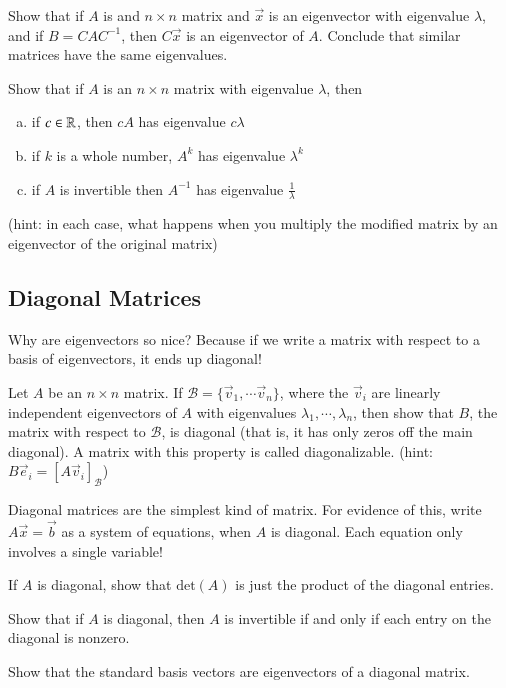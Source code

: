 \documentclass[Main.tex]{subfiles}
\begin{document}
\begin{Ex}
  Show that if $A$ is and $n\times n$ matrix and $\vec{x}$ is an eigenvector with eigenvalue $\lambda$, and if $B=CAC^{-1}$, then $C\vec{x}$ is an eigenvector of $A$.
  Conclude that similar matrices have the same eigenvalues.
\end{Ex}
\begin{Ex}
  Show that if $A$ is an $n\times n$ matrix with eigenvalue $\lambda$, then
  \begin{enumerate}[a)]
    \indentitem \item if $c\in \mathbb{R}$, then $cA$ has eigenvalue $c\lambda$
  \item if $k$ is a whole number, $A^k$ has eigenvalue $\lambda^k$
  \item if $A$ is invertible then $A^{-1}$ has eigenvalue $\frac{1}{\lambda}$
  \end{enumerate}
  (hint: in each case, what happens when you multiply the modified matrix by an eigenvector of the original matrix)
\end{Ex}


\subsection{Diagonal Matrices}

Why are eigenvectors so nice?
Because if we write a matrix with respect to a basis of eigenvectors, it ends up diagonal!
\begin{ImpEasyEx}
  Let $A$ be an $n\times n$ matrix.  
  If $\mathcal{B}=\{\vec{v}_1,\cdots\vec{v}_n\}$, where the $\vec{v}_i$ are linearly independent eigenvectors of $A$ with eigenvalues $\lambda_1,\cdots,\lambda_n$, then 
  show that $B$, the matrix with respect to $\mathcal{B}$, is diagonal (that is, it has only zeros off the main diagonal).  
  A matrix with this property is called diagonalizable.
  (hint: $B\vec{e}_i= [A\vec{v}_i]_\mathcal{B}$)
\end{ImpEasyEx}
Diagonal matrices are the simplest kind of matrix.
For evidence of this, write $A\vec{x}=\vec{b}$ as a system of equations, when $A$ is diagonal.
Each equation only involves a single variable!
\begin{EasyEx}
  If $A$ is diagonal, show that $\mbox{det}(A)$ is just the product of the diagonal entries.
\end{EasyEx}
\begin{EasyEx}
  Show that if $A$ is diagonal, then $A$ is invertible if and only if each entry on the diagonal is nonzero.
\end{EasyEx}
\begin{EasyEx}
  Show that the standard basis vectors are eigenvectors of a diagonal matrix.
\end{EasyEx}
\end{document}
